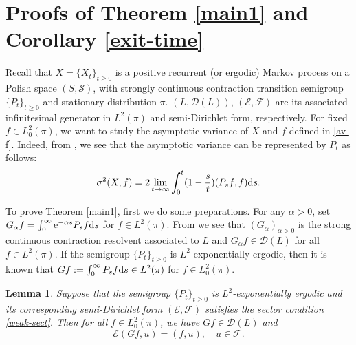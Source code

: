 \documentclass[12pt,reqno]{article}
\newtheorem{lem}[thm]{Lemma}
\theoremstyle{definition}
\theoremstyle{remark}
\theoremstyle{example}
\numberwithin{equation}{section}
\newcommand{\scr}[1]{\mathscr #1}
\def\d{\mathrm{d}}
\def\e{\scr E}
\def\d{\rm d}
\def\lb{\label}
\def\d{{\mbox{\rm d}}}
\begin{document}
{%

\section{Proofs of Theorem \ref{main1} and Corollary \ref{exit-time}}\lb{proofs}

Recall that $X=\{X_t\}_{t\geq0}$ is a positive recurrent (or ergodic) Markov process on a Polish space $(S,\mathcal{S})$, with strongly continuous contraction transition semigroup $\{P_t\}_{t\geq0}$ and stationary distribution $\pi$.
$(L,\mathscr{D}(L))$, $(\e,\scr{F})$ are its associated infinitesimal generator in $L^2(\pi)$ and semi-Dirichlet form, respectively.
For fixed $f\in L^2_0(\pi)$, we want to study the %
 asymptotic variance of $X$ and $f$ defined in \eqref{av-f}. Indeed, from \cite[Section 2.5]{KLO12}, we see that the asymptotic variance can be represented by $P_t$ as follows:
\begin{equation}\lb{av-fp}
\sigma^2(X,f)=2\lim_{t\rightarrow\infty}\int_0^t (1-\frac{s}{t})( P_s f,f)\d s.
\end{equation}


To prove Theorem \ref{main1}, first we do some preparations.
For any $\alpha>0$, set $G_\alpha f=\int_0^\infty \text{e}^{-\alpha s}P_sf\d s$ for $f\in L^2(\pi)$. From \cite[Chapter 1, Proposition 1.10]{MR92} we see that $(G_\alpha)_{\alpha>0}$ is the strong continuous contraction resolvent associated to $L$ and $G_\alpha f\in\scr{D}(L)$ for all  $f\in L^2(\pi)$.
If the semigroup $\{P_t\}_{t\geq0}$ is $L^2$-exponentially ergodic, then it is known that $G f:=\int_0^\infty P_sf\d s\in L^2(\pi)$ for $f\in L_0^2(\pi)$.

\begin{lem}\lb{Gf-u}
Suppose that the semigroup $\{P_t\}_{t\geq0}$ is
$L^2$-exponentially ergodic and its corresponding semi-Dirichlet form $(\e,\scr{F})$ satisfies the sector condition \eqref{weak-sect}. Then for all $f\in L^2_0(\pi)$, we have $Gf\in\scr{D}(L)$ and
$$
\e(Gf,u)=(f,u),\quad  u\in \scr{F}.
$$


\end{lem}}
\end{document}
